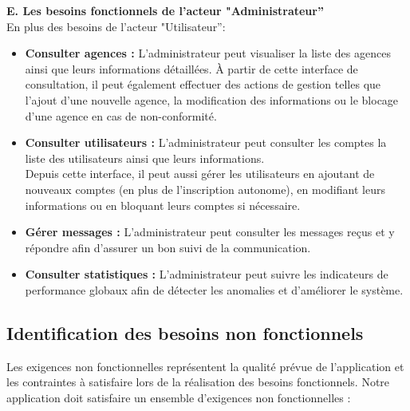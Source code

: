 \textbf{E. Les besoins fonctionnels de l'acteur "Administrateur''}\\
\hspace*{0.8cm}En plus des besoins de l’acteur "Utilisateur'':
\begin{itemize}
    \item \textbf{Consulter agences :} L’administrateur peut visualiser la liste des agences ainsi que leurs informations détaillées. À partir de cette interface de consultation, il peut également effectuer des actions de gestion telles que l’ajout d’une nouvelle agence, la modification des informations ou le blocage d’une agence en cas de non-conformité.
    \item \textbf{Consulter utilisateurs :} L’administrateur peut consulter les comptes la liste des utilisateurs ainsi que leurs informations. \\Depuis cette interface, il peut aussi gérer les utilisateurs en ajoutant de nouveaux comptes (en plus de l’inscription autonome), en modifiant leurs informations ou en bloquant leurs comptes si nécessaire.
    \item \textbf{Gérer messages :} L’administrateur peut consulter les messages reçus et y répondre afin d’assurer un bon suivi de la communication.
    \item \textbf{Consulter statistiques :} L’administrateur peut suivre les indicateurs de performance globaux afin de détecter les anomalies et d’améliorer le système.
\end{itemize}

\subsection{Identification des besoins non fonctionnels}
\label{section2.3.2}

Les exigences non fonctionnelles représentent la qualité prévue de l'application et les contraintes à satisfaire lors de la réalisation des besoins fonctionnels. Notre application doit satisfaire un ensemble d'exigences non fonctionnelles :

